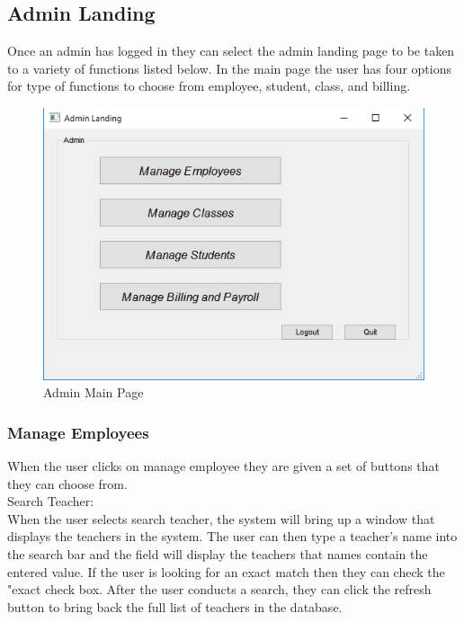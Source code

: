 \subsection{Admin Landing}
Once an admin has logged in they can select the admin landing page to be taken to a variety of functions listed below. 
In the main page the user has four options for type of functions to choose from employee, student, class, and billing.\\

\begin{figure}
  \includegraphics[width=\linewidth]{pics/userGuide/admin_landing.png}
  \caption{Admin Main Page}
  \label{fig:User doc: Admin Landing}
\end{figure}

\subsubsection{Manage Employees} 
When the user clicks on manage employee they are given a set of buttons that they can choose from.\\

Search Teacher:\\
When the user selects search teacher, the system will bring up a window that displays the teachers in the system. The user can then type a teacher's name into the search bar and the field will display the teachers that names contain the entered value. If the user is looking for an exact match then they can check the "exact check box. After the user conducts a search, they can click the refresh button to bring back the full list of teachers in the database.

